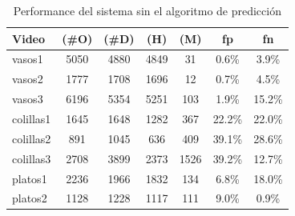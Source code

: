 \begin{table}[htb]
\begin{center}
  \begin{tabular}{|l | c | c | c | c | c | c |}
	\hline  
	\textbf{Video} & \textbf{(\#O)} &  \textbf{(\#D)} & \textbf{(H)} & 
	\textbf{(M)} & \textbf{fp} & \textbf{fn}\\
	\hline
	\hline
	vasos1 & 5050 & 4880 & 4849 & 31 & 0.6\% & 3.9\% \\
	vasos2 & 1777 & 1708 & 1696 & 12 & 0.7\% & 4.5\% \\	
	vasos3 & 6196 & 5354 & 5251 & 103 & 1.9\% & 15.2\% \\
	\hline
	colillas1 & 1645 & 1648 & 1282 & 367 & 22.2\% & 22.0\% \\
	colillas2 & 891 & 1045 & 636 &  409 & 39.1\% & 28.6\% \\
	colillas3 & 2708 & 3899 & 2373 & 1526 & 39.2\% & 12.7\% \\
	\hline
	platos1 & 2236 & 1966 & 1832 & 134 & 6.8\% & 18.0\%\\
	platos2 & 1128 & 1228 & 1117 & 111& 9.0\% & 0.9\% \\
	\hline
	\end{tabular}
	\caption[Performance del algoritmo de visi\'on]{\label{tab:result} Performance del sistema sin el algoritmo de predicci\'on}
	\end{center}
\end{table}

